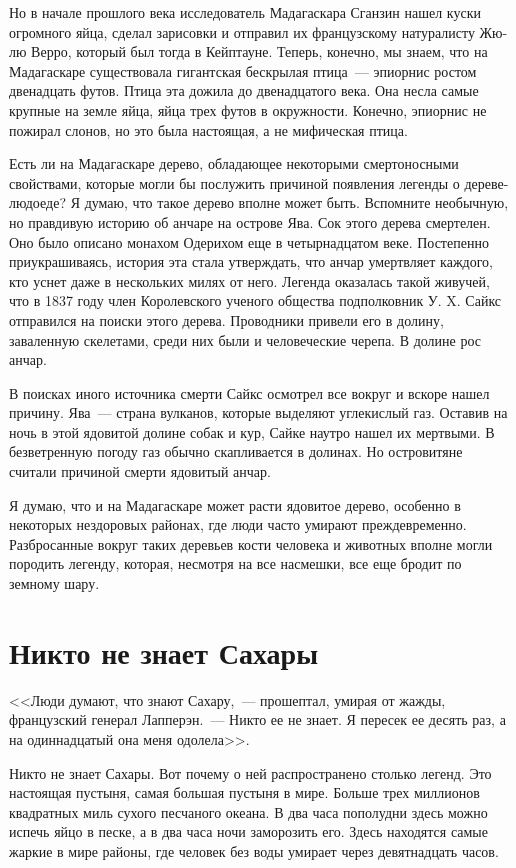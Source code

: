 \documentclass[12pt,a4paper,twoside,openany,svgnames]{memoir}
\begin{document}
Но в начале прошлого века исследователь Мадагаскара Сганзин нашел куски огромного яйца, сделал зарисовки и отправил их французскому натуралисту Жю-лю Верро, который был тогда в Кейптауне. Теперь, конечно, мы знаем, что на Мадагаскаре существовала гигантская бескрылая птица~--- эпиорнис ростом двенадцать футов. Птица эта дожила до двенадцатого века. Она несла самые крупные на земле яйца, яйца трех футов в окружности. Конечно, эпиорнис не пожирал слонов, но это была настоящая, а не мифическая птица.

Есть ли на Мадагаскаре дерево, обладающее некоторыми смертоносными свойствами, которые могли бы послужить причиной появления легенды о дереве-людоеде? Я думаю, что такое дерево вполне может быть. Вспомните необычную, но правдивую историю об анчаре на острове Ява. Сок этого дерева смертелен. Оно было описано монахом Одерихом еще в четырнадцатом веке. Постепенно приукрашиваясь, история эта стала утверждать, что анчар умертвляет каждого, кто уснет даже в нескольких милях от него. Легенда оказалась такой живучей, что в 1837 году член Королевского ученого общества подполковник У. X. Сайкс отправился на поиски этого дерева. Проводники привели его в долину, заваленную скелетами, среди них были и человеческие черепа. В долине рос анчар.

В поисках иного источника смерти Сайкс осмотрел все вокруг и вскоре нашел причину. Ява~--- страна вулканов, которые выделяют углекислый газ. Оставив на ночь в этой ядовитой долине собак и кур, Сайке наутро нашел их мертвыми. В безветренную погоду газ обычно скапливается в долинах. Но островитяне считали причиной смерти ядовитый анчар.

Я думаю, что и на Мадагаскаре может расти ядовитое дерево, особенно в некоторых нездоровых районах, где люди часто умирают преждевременно. Разбросанные вокруг таких деревьев кости человека и животных вполне могли породить легенду, которая, несмотря на все насмешки, все еще бродит по земному шару.

\chapter{Никто не знает Сахары}

<<Люди думают, что знают Сахару,~--- прошептал, умирая от жажды, французский генерал Лапперэн.~--- Никто ее не знает. Я пересек ее десять раз, а на одиннадцатый она меня одолела>>.

Никто не знает Сахары. Вот почему о ней распространено столько легенд. Это настоящая пустыня, самая большая пустыня в мире. Больше трех миллионов квадратных миль сухого песчаного океана. В два часа пополудни здесь можно испечь яйцо в песке, а в два часа ночи заморозить его. Здесь находятся самые жаркие в мире районы, где человек без воды умирает через девятнадцать часов.
\end{document}
